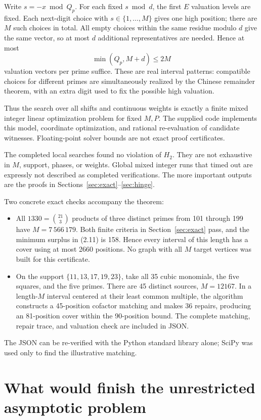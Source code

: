 \documentclass[11pt,a4paper]{article}
\theoremstyle{remark}
\begin{document}
Write \(s=-x\bmod Q_p\). For each fixed \(s\bmod d\), the first \(E\)
valuation levels are fixed. Each next-digit choice with
\(s\in\{1,\ldots,M\}\) gives one high position; there are \(M\) such
choices in total. All empty choices within the same residue modulo
\(d\) give the same vector, so at most \(d\) additional representatives
are needed. Hence at most
\[
 \min(Q_p,M+d)\le2M
 \tag{8.1}
\]
valuation vectors per prime suffice. These are real interval
patterns: compatible choices for different primes are simultaneously
realized by the Chinese remainder theorem, with an extra digit used
to fix the possible high valuation.

Thus the search over all shifts and continuous weights is exactly a
finite mixed integer linear optimization problem for fixed \(M,P\).
The supplied code implements this model, coordinate optimization, and
rational re-evaluation of candidate witnesses. Floating-point solver
bounds are not exact proof certificates.

The completed local searches found no violation of \(H_2\).
They are not exhaustive in \(M\), support, phases, or weights.
Global mixed integer runs that timed out are expressly not described
as completed verifications. The more important outputs are the
proofs in Sections~\ref{sec:exact}--\ref{sec:hinge}.

Two concrete exact checks accompany the theorem:
\begin{itemize}
\item All \(1330=\binom{21}{3}\) products of three distinct primes
from 101 through 199 have \(M=7\,566\,179\). Both finite criteria
in Section~\ref{sec:exact} pass, and the minimum surplus in (2.11)
is 158. Hence every interval of this length has a cover using
at most 2660 positions. No graph with all \(M\) target vertices
was built for this certificate.
\item On the support \(\{11,13,17,19,23\}\), take all 35 cubic
monomials, the five squares, and the five primes. There are 45
distinct sources, \(M=12167\). In a length-\(M\) interval centered
at their least common multiple, the algorithm constructs a
45-position cofactor matching and makes 36 repairs, producing an
81-position cover within the 90-position bound. The complete
matching, repair trace, and valuation check are included in JSON.
\end{itemize}
The JSON can be re-verified with the Python standard library alone;
SciPy was used only to find the illustrative matching.

\section{What would finish the unrestricted asymptotic problem}
\label{sec:remaining}
\end{document}
